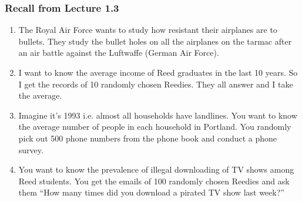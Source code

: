 \documentclass[slides]{beamer}
\begin{document}
\begin{frame}
\frametitle{Recall from Lecture 1.3}

\begin{small}
\begin{enumerate}
\item The Royal Air Force wants to study how resistant their airplanes are to bullets. They study the bullet holes on all the airplanes on the tarmac after an air battle against the Luftwaffe (German Air Force).
\item I want to know the average income of Reed graduates in the last 10 years.  So I get the records of 10 randomly chosen Reedies.  They all answer and I take the average.
\item Imagine it's 1993 i.e. almost all households have landlines.  You want to know the average number of people in each household in Portland.  You randomly pick out 500 phone numbers from the phone book and conduct a phone survey.
\item You want to know the prevalence of illegal downloading of TV shows among Reed students.  You get the emails of 100 randomly chosen Reedies and ask them ``How many times did you download a pirated TV show last week?''
\end{enumerate}
\end{small}

\end{frame}
\end{document}
